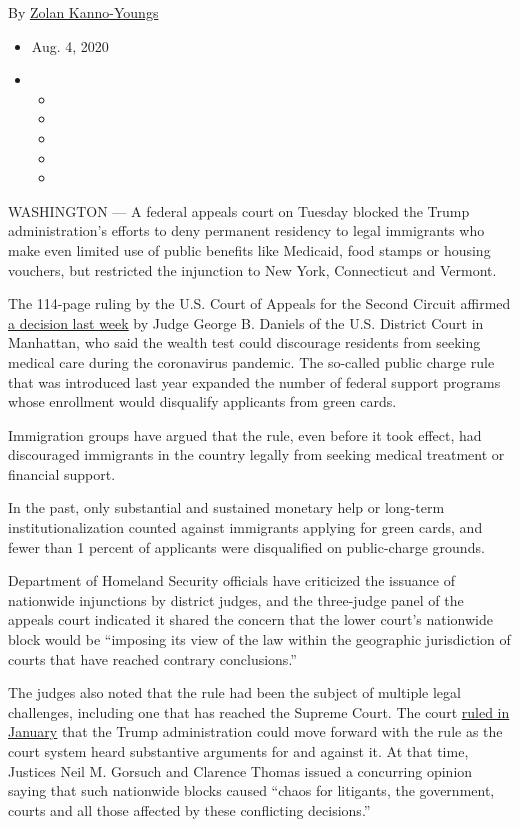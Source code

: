 By \href{https://www.nytimes3xbfgragh.onion/by/zolan-kanno-youngs}{Zolan
Kanno-Youngs}

\begin{itemize}
\item
  Aug. 4, 2020
\item
  \begin{itemize}
  \item
  \item
  \item
  \item
  \item
  \end{itemize}
\end{itemize}

WASHINGTON --- A federal appeals court on Tuesday blocked the Trump
administration's efforts to deny permanent residency to legal immigrants
who make even limited use of public benefits like Medicaid, food stamps
or housing vouchers, but restricted the injunction to New York,
Connecticut and Vermont.

The 114-page ruling by the U.S. Court of Appeals for the Second Circuit
affirmed
\href{https://www.nytimes3xbfgragh.onion/2020/07/30/us/trump-green-card.html}{a
decision last week} by Judge George B. Daniels of the U.S. District
Court in Manhattan, who said the wealth test could discourage residents
from seeking medical care during the coronavirus pandemic. The so-called
public charge rule that was introduced last year expanded the number of
federal support programs whose enrollment would disqualify applicants
from green cards.

Immigration groups have argued that the rule, even before it took
effect, had discouraged immigrants in the country legally from seeking
medical treatment or financial support.

In the past, only substantial and sustained monetary help or long-term
institutionalization counted against immigrants applying for green
cards, and fewer than 1 percent of applicants were disqualified on
public-charge grounds.

Department of Homeland Security officials have criticized the issuance
of nationwide injunctions by district judges, and the three-judge panel
of the appeals court indicated it shared the concern that the lower
court's nationwide block would be ``imposing its view of the law within
the geographic jurisdiction of courts that have reached contrary
conclusions.''

The judges also noted that the rule had been the subject of multiple
legal challenges, including one that has reached the Supreme Court. The
court
\href{https://www.nytimes3xbfgragh.onion/2020/01/27/us/supreme-court-trump-green-cards.html}{ruled
in January} that the Trump administration could move forward with the
rule as the court system heard substantive arguments for and against it.
At that time, Justices Neil M. Gorsuch and Clarence Thomas issued a
concurring opinion saying that such nationwide blocks caused ``chaos for
litigants, the government, courts and all those affected by these
conflicting decisions.''

